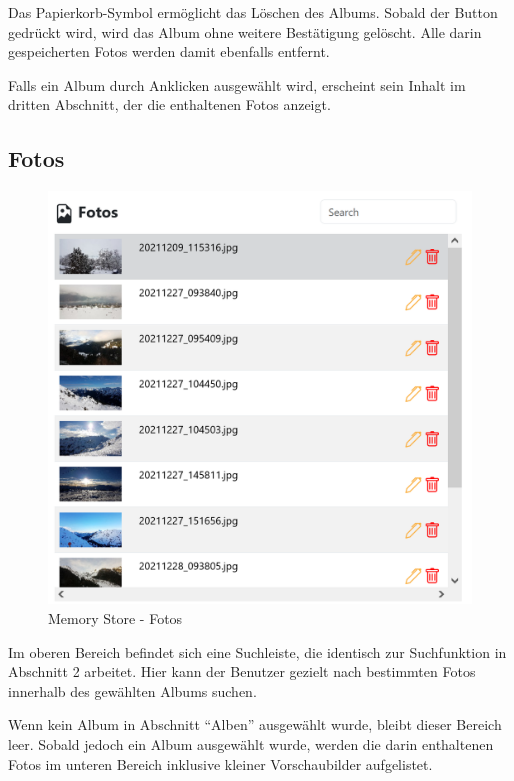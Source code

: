 Das Papierkorb-Symbol ermöglicht das Löschen des Albums. Sobald der Button gedrückt 
wird, wird das Album ohne weitere Bestätigung gelöscht. Alle darin gespeicherten 
Fotos werden damit ebenfalls entfernt.

Falls ein Album durch Anklicken ausgewählt wird, erscheint sein Inhalt im dritten 
Abschnitt, der die enthaltenen Fotos anzeigt.

\subsection{Fotos}

\begin{figure}
    \centering
    \includegraphics[scale=0.4]{pics/memory_store_teil3.PNG}
    \caption{Memory Store - Fotos}
    \label{fig:memory-store-fotos}
\end{figure}

Im oberen Bereich befindet sich eine Suchleiste, die identisch zur Suchfunktion in 
Abschnitt 2 arbeitet. Hier kann der Benutzer gezielt nach bestimmten Fotos innerhalb 
des gewählten Albums suchen.

Wenn kein Album in Abschnitt ``Alben'' ausgewählt wurde, bleibt dieser Bereich leer. 
Sobald jedoch ein Album ausgewählt wurde, werden die darin enthaltenen Fotos im 
unteren Bereich inklusive kleiner Vorschaubilder aufgelistet.

